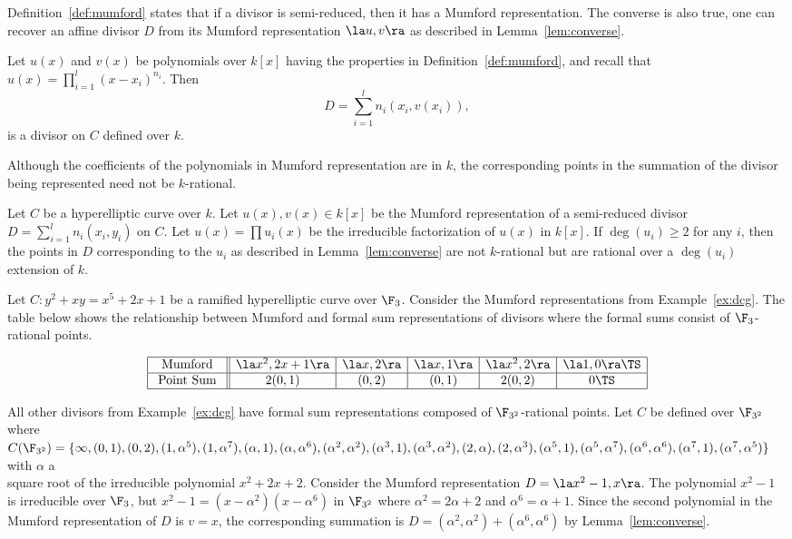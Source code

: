 Definition~\ref{def:mumford} states that if a divisor is semi-reduced, then it
has a Mumford representation. The converse is also true, one can recover an
affine divisor $D$ from its Mumford representation $\la u,v \ra$ as described in
Lemma~\ref{lem:converse}. 

\bl\label{lem:converse} Let $u(x)$ and $v(x)$ be polynomials over $k[x]$ having
the properties in Definition~\ref{def:mumford}, and recall that $u(x) =
\prod^l_{i=1}(x - x_i)^{n_i}$. Then $$D = \sum^l_{i=1} n_i(x_i,v(x_i)), $$ is a
divisor on $C$ defined over $k$.
\el

Although the coefficients of the polynomials in Mumford representation are in
$k$, the corresponding points in the summation of the divisor being represented
need not be $k$-rational.  

\br Let $C$ be a hyperelliptic curve over $k$. Let $u(x),v(x) \in k[x]$ be the
Mumford representation of a semi-reduced divisor $D = \sum^l_{i=1} n_i(x_i,y_i)$
on $C$. Let $u(x) = \prod u_i(x)$ be the irreducible factorization of $u(x)$ in
$k[x]$. If $\deg(u_i) \geq 2$ for any $i$, then the points in $D$ corresponding
to the $u_i$ as described in Lemma~\ref{lem:converse} are not $k$-rational but
are rational over a $\deg(u_i)$ extension of $k$.
\er

\be
Let $C : y^2 + xy = x^5 + 2x + 1$ be a ramified hyperelliptic curve over $\F_3$.
Consider the Mumford representations from Example~\ref{ex:dcg}. The table below
shows the relationship between Mumford and formal sum representations of
divisors where the formal sums consist of $\F_3$-rational points.

\begin{table}[ht]\label{tab:irred}
  \[ \begin{array}{|c||c|c|c|c|c|} 
    \hline
    \text{ Mumford }  &\la x^2,2x + 1 \ra& \la x,2 \ra&\la x,1 \ra&\la x^2,2\ra &\la 1,0\ra \TS\\ \hline
    \text{ Point Sum }&2(0,1)      &(0,2)&(0,1)&2(0,2) &0     \TS\\ \hline
  \end{array} \]
\end{table} 

All other divisors from Example~\ref{ex:dcg} have formal sum representations
composed of $\F_{3^2}$-rational points. Let $C$ be defined over $\F_{3^2}$ where
$C(\F_{3^2}) = \{\infty, (0,1), (0 , 2), (1 , \alpha^5), (1 , \alpha^7),
(\alpha, 1), (\alpha , \alpha^6),\\ (\alpha^2 , \alpha^2), (\alpha^3 , 1),
(\alpha^3 , \alpha^2), (2 , \alpha), (2 , \alpha^3), (\alpha^5 , 1), (\alpha^5 ,
\alpha^7), (\alpha^6 , \alpha^6), (\alpha^7 , 1), (\alpha^7 , \alpha^5) \}$ with
$\alpha$ a\\ square root of the irreducible polynomial $x^2 + 2x + 2$. Consider
the Mumford representation $D = \la x^2 - 1,x \ra$. The polynomial $x^2 - 1$ is
irreducible over $\F_3$, but $x^2 - 1 = (x - \alpha^2)(x - \alpha^6)$ in
$\F_{3^2}$ where $\alpha^2 = 2\alpha+2$ and $\alpha^6 = \alpha+1$. Since the
second polynomial in the Mumford representation of $D$ is $v = x$, the
corresponding summation is $D = (\alpha^2 , \alpha^2) + (\alpha^6, \alpha^6)$ by
Lemma~\ref{lem:converse}.
\ee

